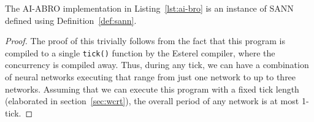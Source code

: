 


\begin{prop}
	\label{lemma1}
	The AI-ABRO implementation in Listing~\ref{lst:ai-bro} is an instance of \ac{SANN} defined using Definition~\ref{def:sann}.
\end{prop}

\begin{proof}
	The proof of this trivially follows from the fact that this program is compiled to a single \texttt{tick()} function by the 
	Esterel compiler, where the concurrency is compiled away. Thus, during any tick, we can have a combination of neural networks 
	executing that range from just one network to up to three networks. Assuming that we can execute this program with a fixed tick length 
	(elaborated in section~\ref{sec:wcrt}), the overall period of any network is at most 1-tick. 
\end{proof}
